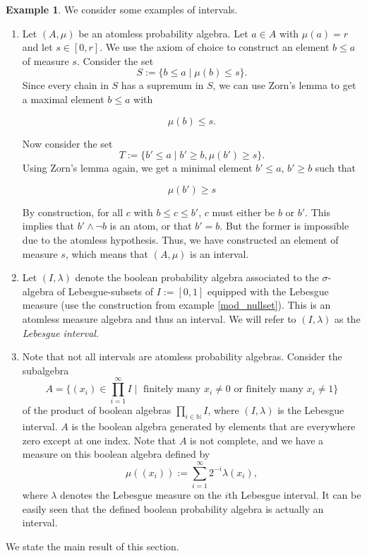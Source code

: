 \documentclass[a4paper]{amsproc}
\theoremstyle{plain}
\theoremstyle{definition}
\newtheorem{example}[theorem]{Example}
\theoremstyle{remark}
\numberwithin{equation}{section}
\begin{document}
\begin{example} \label{interval_examples} We consider some examples of intervals.
\begin{enumerate}
\item Let $(A,\mu)$ be an atomless probability algebra. Let $a \in A$ with $\mu(a) = r$ and let $s \in [0,r]$. We use the axiom of choice to construct an element $b
\leq a$ of measure $s$. Consider the set
\[
S := \{ b \leq a \mid \mu(b) \leq s \}.
\]
Since every chain in $S$ has a supremum in $S$, we can use Zorn's lemma to get a maximal element $b \leq a$ with

\[
    \mu(b) \leq s .
\]

Now consider the set
\[
T := \{ b' \leq a \mid b' \geq b, \mu(b') \geq s\} .
\]
Using Zorn's lemma again, we get a minimal element $b' \leq a$, $b' \geq b$ such that

\[
    \mu(b') \geq s
\]

By construction, for all $c$ with $b \leq c \leq b'$, $c$ must either be $b$ or $b'$. This implies that $b' \wedge \neg b$ is an atom, or that $b' = b$. But the former is impossible due to the atomless hypothesis. Thus, we have constructed an element of measure $s$, which means that $(A,\mu)$ is an interval.
\item Let $(I,\lambda)$ denote the boolean probability algebra associated to the $\sigma$-algebra of Lebesgue-subsets of $I := [0,1]$ equipped with the Lebesgue measure (use the construction from example \ref{mod_nullset}). This is an atomless measure algebra and thus an interval. We will refer to $(I, \lambda)$ as the \emph{Lebesgue interval}.
\item Note that not all intervals are atomless probability algebras. Consider the subalgebra
\[
A = \{(x_i) \in \prod_{i=1}^{\infty} I \mid \text{ finitely many } x_i \neq 0 \text{ or finitely many } x_i \neq 1 \}
\]
of the product of boolean algebras $\prod_{i \in \mathbb{N}} I$, where $(I, \lambda)$ is the Lebesgue interval. $A$ is the boolean algebra generated by elements that are everywhere zero except at one index. Note that $A$ is not complete, and we have a measure on this boolean algebra defined by
\[
\mu((x_i)) := \sum_{i=1}^{\infty} 2^{-i} \lambda(x_i) ,
\]
where $\lambda$ denotes the Lebesgue measure on the $i$th Lebesgue interval. It can be easily seen that the defined boolean probability algebra is actually an interval.
\end{enumerate}
\end{example}

We state the main result of this section.
\end{document}
